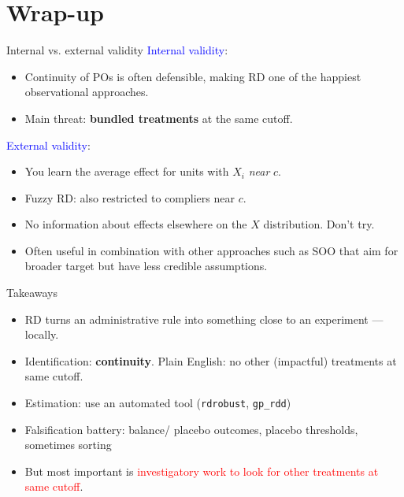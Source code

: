 \documentclass[handout,xcolor=dvipsnames]{beamer}
\begin{document}
\section{Wrap-up}

\begin{frame}{Internal vs. external validity}
\small
{} \textcolor{Blue}{Internal validity}:
\begin{itemize}
\footnotesize
  \item Continuity of POs is often defensible, making RD one of the happiest observational approaches. 
  \item Main threat: \textbf{bundled treatments} at the same cutoff.
\end{itemize}
\medskip
{} \textcolor{Blue}{External validity}:
\begin{itemize}
\footnotesize
  \item You learn the average effect for units with $X_i$ \textit{near} $c$.
  \item Fuzzy RD: also restricted to compliers near $c$.
  \item No information about effects elsewhere on the $X$ distribution. Don't try.
  \item Often useful in combination with other approaches such as SOO that aim for broader target but have less credible assumptions.
\end{itemize}
\end{frame}


\begin{frame}{Takeaways}
\small
\begin{itemize}
\item<1-> RD turns an administrative rule into something close to an experiment --- locally.
\medskip
\item<2-> Identification: \textbf{continuity}. Plain English: no other (impactful) treatments at same cutoff. 
\medskip
\item<3-> Estimation: use an automated tool (\texttt{rdrobust}, \texttt{gp\_rdd})
\medskip
\item<4-> Falsification battery: balance/ placebo outcomes, placebo thresholds, sometimes sorting
\medskip
\item<5-> But most important is \textcolor{Red}{investigatory work to look for other treatments at same cutoff}.
\end{itemize}
\end{frame}
\end{document}
